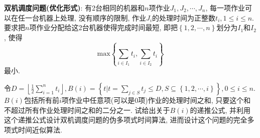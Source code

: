 \documentclass{article}
\begin{document}
\pagebreak

\begin{homeworkProblem}
    \textbf{双机调度问题(优化形式)}: 有2台相同的机器和$n$项作业$J_1,J_2,\cdots,J_n$, 每一项作业可以在任一台机器上处理, 没有顺序的限制, 作业$J_i$的处理时间为正整数$t_i,1\leq i \leq n$. 要求把$n$项作业分配给这2台机器使得完成时间最短, 即把$\left\{ 1,2,\cdots ,n \right\} $划分为$I_1$和$I_2$, 使得$$\text{max} \left\{ \sum_{i\in I_1}{t_i},\sum_{i\in I_2}{t_i} \right\} 
    $$
    最小.

    令$\displaystyle D=\left\lfloor \frac{1}{2}\sum_{i=1}^n{t_i} \right\rfloor ,B\left( i \right) =\left\{ t \bigg|t=\sum_{j\in S}{t_j}\le D,S\subseteq \left\{ 1,2,\cdots ,i \right\} \right\} ,0\le i\le n$. $B(i)$包括所有前$i$项作业中任意项(可以是0项)作业的处理时间之和, 只要这个和不超过所有作业处理时间之和的二分之一. 试给出关于$B(i)$的递推公式, 并利用这个递推公式设计双机调度问题的伪多项式时间算法, 进而设计这个问题的完全多项式时间近似算法.


\end{homeworkProblem}
\end{document}
